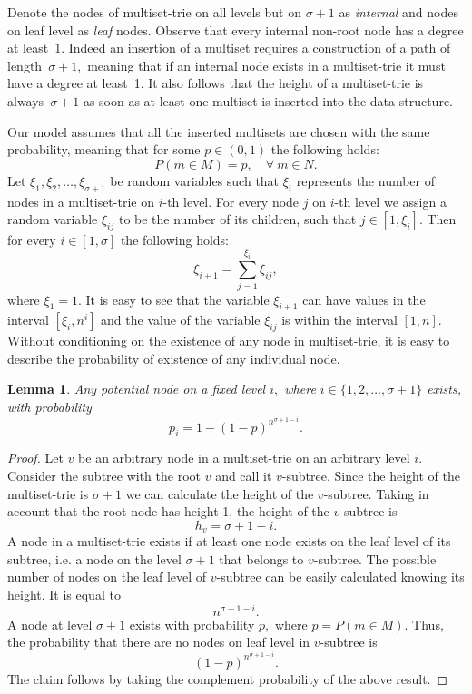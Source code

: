 \documentclass[10pt,letterpaper]{article}
\newtheorem{lemma}{Lemma}
\begin{document}
Denote the nodes of multiset-trie on all levels but on $\sigma + 1$ as \emph{internal}
and nodes on leaf level as \emph{leaf} nodes.
%
Observe that every internal non-root node has a degree at least~1. Indeed an
insertion of a multiset requires a construction of a path of length~$\sigma + 1,$
meaning that if an internal node exists in a multiset-trie it must have a degree
at least~1. It also follows that the height of a multiset-trie is always~$\sigma +1$
as soon as at least one multiset is inserted into the data structure.

Our model assumes that all the inserted multisets are chosen with the same probability,
meaning that for some $p\in (0,1)$ the following holds:
\[
P(m\in M) = p, \quad \forall~m\in N.
\]
%
Let $\xi_1, \xi_2, \ldots, \xi_{\sigma+1}$ be random variables such that $\xi_i$
represents the number of nodes in a multiset-trie on $i$-th level. For every node $j$ 
on $i$-th level we assign a random variable $\xi_{ij}$ to be the number of its children, 
such that $j\in[1,\xi_i].$ Then for every $i\in[1,\sigma]$ the following holds:
%
\begin{equation}\label{eq:sum_recursive}
\xi_{i+1} = \sum_{j=1}^{\xi_i} \xi_{ij},
\end{equation}
%
where $\xi_1 = 1.$
%
It is easy to see that the variable $\xi_{i+1}$ can have values in the interval
$[\xi_i,n^{i}]$ and the value of the variable $\xi_{ij}$ is within the interval $[1,n].$
Without conditioning on the existence of any node in multiset-trie, 
it is easy to describe the probability of existence of any individual node.

\begin{lemma}\label{l:prob-node-existence}
Any potential node on a fixed level $i,$ where $i\in \{ 1,2,\ldots, \sigma +1 \}$ exists, %
with probability
\begin{equation}
p_i=1-(1-p)^{n^{\sigma + 1 -i}}.
\end{equation}
\end{lemma}
\begin{proof}
Let $v$ be an arbitrary node in a multiset-trie on an arbitrary level $i.$ Consider
the subtree with the root $v$ and call it $v$-subtree. Since the height of the
multiset-trie is $\sigma + 1$ we can calculate the height of the $v$-subtree.
Taking in account that the root node has height 1, the height of the $v$-subtree is
%
\[
h_v = \sigma + 1 - i.
\]
%
A node in a multiset-trie exists if at least one node exists on the leaf level of its
subtree, i.e. a node on the level $\sigma + 1$ that belongs to $v$-subtree. The possible
number of nodes on the leaf level of $v$-subtree can be easily calculated knowing its height.
It is equal to
%
\[
n^{\sigma + 1 - i}.
\]
%
A node at level $\sigma+1$ exists with probability $p,$ where $p = P(m\in M).$
Thus, the probability that there are no nodes on leaf level in $v$-subtree is
%
\[
(1-p)^{n^{\sigma +1 - i}}.
\]
%
The claim follows by taking the complement probability of the above result. 

%
\end{proof}
\end{document}

